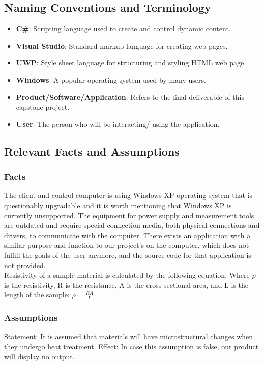 \documentclass[12pt, titlepage]{article}
\begin{document}
\subsection{Naming Conventions and Terminology}

\begin{itemize}
    \item \textbf{C\#}: Scripting language used to create and control dynamic content.
    \item \textbf{Visual Studio}: Standard markup language for creating web pages.
    \item \textbf{UWP}: Style sheet language for structuring and styling HTML web page.
    \item \textbf{Windows}: A popular operating system used by many users.
    \item \textbf{Product/Software/Application}: Refers to the final deliverable of this capstone project.
    \item \textbf{User}: The person who will be interacting/ using the application.
\end{itemize}

\subsection{Relevant Facts and Assumptions}
\subsubsection{Facts}
The client and control computer is using Windows XP operating system that is questionably upgradable and it is worth mentioning that Windows XP is currently unsupported. The equipment for power supply and measurement tools are outdated and require special connection media, both physical connections and drivers, to communicate with the computer. There exists an application with a similar purpose and function to our project’s on the computer, which does not fulfill the goals of the user anymore, and the source code for that application is not provided.\\

\noindent Resistivity of a sample material is calculated by the following equation. Where $\rho$ is the resistivity, R is the resistance, A is the cross-sectional area, and L is the length of the sample:
$ \rho = \frac{RA}{L} $

\subsubsection{Assumptions}
Statement: It is assumed that materials will have microstructural changes when they undergo heat treatment. 
Effect: In case this assumption is false, our product will display no output. \\
\end{document}
